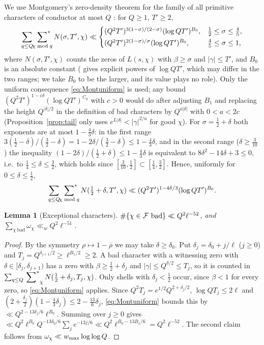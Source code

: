 \documentclass[11pt]{amsart}
\newtheorem{lemma}[theorem]{Lemma}
\theoremstyle{definition}
\theoremstyle{remark}
\numberwithin{equation}{section}
\begin{document}
We use Montgomery's zero-density theorem for the family of all primitive characters of conductor at most $Q$ \cite[Thm.~1]{Mon69}: for $Q\ge1$, $T'\ge2$,
\begin{equation}\label{eq:Montgomery}
\sum_{q\le Q}\sideset{}{^{*}}\sum_{\chi\bmod q}N(\sigma,T',\chi)\ll\begin{cases}(Q^2T')^{3(1-\sigma)/(2-\sigma)}(\log QT')^{B_0},&\tfrac12\le\sigma\le\tfrac45,\\[2pt](Q^2T')^{2(1-\sigma)/\sigma}(\log QT')^{B_0},&\tfrac45\le\sigma\le1,\end{cases}
\end{equation}
where $N(\sigma,T',\chi)$ counts the zeros of $L(s,\chi)$ with $\beta\ge\sigma$ and $|\gamma|\le T'$, and $B_0$ is an absolute constant (\cite{Mon69} gives explicit powers of $\log QT'$, which may differ in the two ranges; we take $B_0$ to be the larger, and its value plays no role). Only the uniform consequence \eqref{eq:Montuniform} is used; any bound $(Q^2T')^{1-c\delta}(\log QT')^{C_0}$ with $c>0$ would do after adjusting $B_1$ and replacing the height $Q^{|\delta|/2}$ in the definition of bad characters by $Q^{a|\delta|}$ with $0<a<2c$ (Proposition~\ref{prop:tail} only uses $e^{L|\delta|}<|\gamma|^{2/a}$ for good $\chi$). For $\sigma=\frac12+\delta$ both exponents are at most $1-\frac43\delta$: in the first range $3(\frac12-\delta)/(\frac32-\delta)=1-2\delta/(\frac32-\delta)\le1-\frac43\delta$, and in the second range ($\delta\ge\frac3{10}$) the inequality $(1-2\delta)/(\frac12+\delta)\le1-\frac43\delta$ is equivalent to $8\delta^2-14\delta+3\le0$, i.e.\ to $\frac14\le\delta\le\frac32$, which holds since $[\frac3{10},\frac12]\subset[\frac14,\frac32]$. Hence, uniformly for $0\le\delta\le\frac12$,
\begin{equation}\label{eq:Montuniform}
\sum_{q\le Q}\sideset{}{^{*}}\sum_{\chi\bmod q}N(\tfrac12+\delta,T',\chi)\ll(Q^2T')^{1-4\delta/3}(\log QT')^{B_0}.
\end{equation}

\begin{lemma}[Exceptional characters]\label{lem:bad}
$\#\{\chi\in\mathcal F\text{ bad}\}\ll Q^2\ell^{-52}$, and $\sum_{\chi\ \mathrm{bad}}\omega_\chi\ll_w Q^2\ell^{-51}$.
\end{lemma}
\begin{proof}
By the symmetry $\rho\mapsto1-\overline\rho$ we may take $\delta\ge\delta_0$. Put $\delta_j=\delta_0+j/\ell$ ($j\ge0$) and $T_j=Q^{\delta_{j+1}/2}\ge\ell^{B_1/2}\ge2$. A bad character with a witnessing zero with $\delta\in[\delta_j,\delta_{j+1})$ has a zero with $\beta\ge\frac12+\delta_j$ and $|\gamma|\le Q^{\delta/2}\le T_j$, so it is counted in $\sum_{q\le Q}\sideset{}{^{*}}\sum_{\chi}N(\frac12+\delta_j,T_j,\chi)$. Only shells with $\delta_j<\frac12$ occur, since $\beta<1$ for every zero, so \eqref{eq:Montuniform} applies. Since $Q^2T_j=e^{1/2}Q^{2+\delta_j/2}$, $\log QT_j\le2\ell$ and $(2+\frac{\delta_j}2)(1-\frac43\delta_j)\le2-\frac{13}6\delta_j$, \eqref{eq:Montuniform} bounds this by $\ll Q^{2-13\delta_j/6}\ell^{B_0}$. Summing over $j\ge0$ gives $\ll Q^2\ell^{B_0}Q^{-13\delta_0/6}\sum_je^{-13j/6}\ll Q^2\ell^{B_0-13B_1/6}=Q^2\ell^{-52}$. The second claim follows from $\omega_\chi\ll w_{\max}\log\log Q$.
\end{proof}
\end{document}
